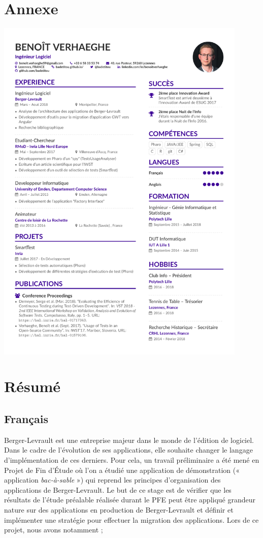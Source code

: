 \newpage

\hypertarget{annexe}{%
\section{Annexe}\label{annexe}}

\includegraphics[width=0.9\textwidth,height=\textheight]{cv/cv.pdf}
\newpage

\hypertarget{ruxe9sumuxe9}{%
\section*{Résumé}\label{ruxe9sumuxe9}}

\hypertarget{franuxe7ais}{%
\subsection*{Français}\label{franuxe7ais}}

Berger-Levrault est une entreprise majeur dans le monde de l'édition de
logiciel. Dans le cadre de l'évolution de ses applications, elle
souhaite changer le langage d'implémentation de ces derniers. Pour cela,
un travail préliminaire a été mené en Projet de Fin d'Étude où l'on a
étudié une application de démonstration (« application
\emph{bac-à-sable} ») qui reprend les principes d'organisation des
applications de Berger-Levrault. Le but de ce stage est de vérifier que
les résultats de l'étude préalable réalisée durant le PFE peut être
appliqué grandeur nature sur des applications en production de
Berger-Levrault et définir et implémenter une stratégie pour effectuer
la migration des applications. Lors de ce projet, nous avons notamment ;


